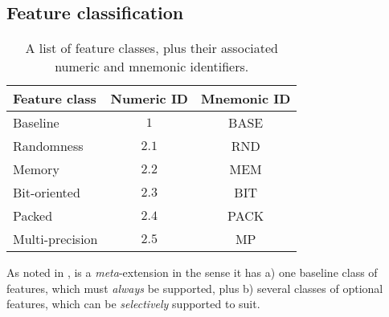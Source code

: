
\subsection{Feature classification}
\label{sec:bg:feature}

\begin{table}[t]
\begin{center}
\begin{tabular}{|l|cc|}
\hline
Feature class   & Numeric ID & Mnemonic ID \\
\hline
Baseline        & $1$        & BASE        \\
Randomness      & $2.1$      & RND         \\
Memory          & $2.2$      & MEM         \\
Bit-oriented    & $2.3$      & BIT         \\
Packed          & $2.4$      & PACK        \\
Multi-precision & $2.5$      & MP          \\
\hline
\end{tabular}
\end{center}
\caption{A list of feature classes, plus their associated numeric and mnemonic identifiers.}
\label{tab:feature}
\end{table}

As noted in , \XCID is a {\em meta}-extension in the
sense it has 
a) one baseline class of features,
   which must {\em always} be supported,
   plus
b) several classes of optional               features,
   which can be {\em selectively} supported to suit.



